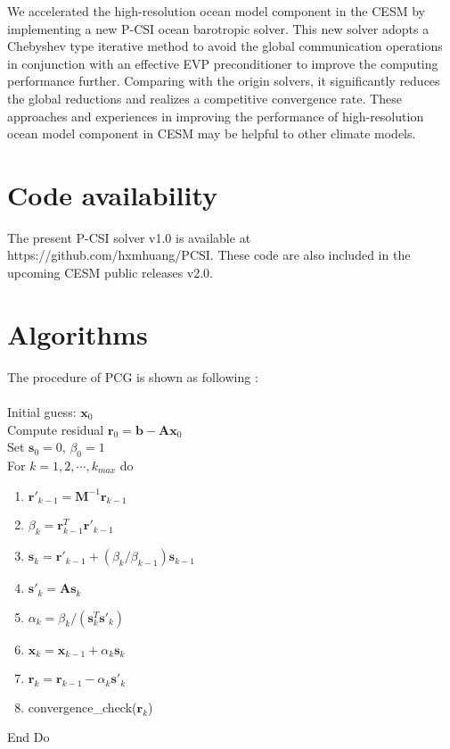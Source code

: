 \conclusions \label{se:conc}
We accelerated the high-resolution ocean model component in the CESM by implementing a new P-CSI ocean barotropic solver. This new solver adopts a Chebyshev type iterative method to avoid the global communication operations in conjunction with an effective EVP preconditioner to improve the computing performance further. Comparing with the origin solvers, it significantly reduces the global reductions and realizes a competitive convergence rate. These approaches and experiences in improving the performance of high-resolution ocean model component in CESM may be helpful to other climate models.

\section{Code availability}
The present P-CSI solver v1.0 is available at https://github.com/hxmhuang/PCSI.  These code are also included in the upcoming CESM public releases v2.0.

\appendix
\section{Algorithms} \label{algorithm}   %

The procedure of PCG is shown as following \citep{smith2010parallel}: \\
 \space \\
Initial guess: $\textbf{x}_0$  \\
Compute residual $\textbf{r}_0 = \textbf{b}- {\textbf{A}}\textbf{x}_0$ \\
Set $\textbf{s}_0 =0$, $\beta_0=1$\\
For $k = 1, 2, \cdots,  k_{max}$  do
\begin{enumerate}
\item $\textbf{r}'_{k-1} = \textbf{M}^{-1}\textbf{r}_{k-1} $  \label{pcg_scale1}
\item $\beta_k = \textbf{r}_{k-1}^T\textbf{r}'_{k-1} $\label{pcg_dot1}
\item $\textbf{s}_k = \textbf{r}'_{k-1} +(\beta_k/\beta_{k-1})\textbf{s}_{k-1} $ \label{pcg_scale2}
\item $\textbf{s}'_k = \textbf{A}\textbf{s}_k   $ \label{pcg_mat}
\item $\alpha_k =\beta_k/(\textbf{s}_k^T\textbf{s}'_k )$\label{pcg_dot2}
\item $\textbf{x}_k= {\textbf{x}}_{k-1} +\alpha_k \textbf{s}_k   $ \label{pcg_scale3}
\item $\textbf{r}_k =\textbf{r}_{k-1} -\alpha_k\textbf{s}'_k  $\label{pcg_scale4}
\item convergence\_check($\textbf{r}_{k}$)
\end{enumerate}
End Do \\

